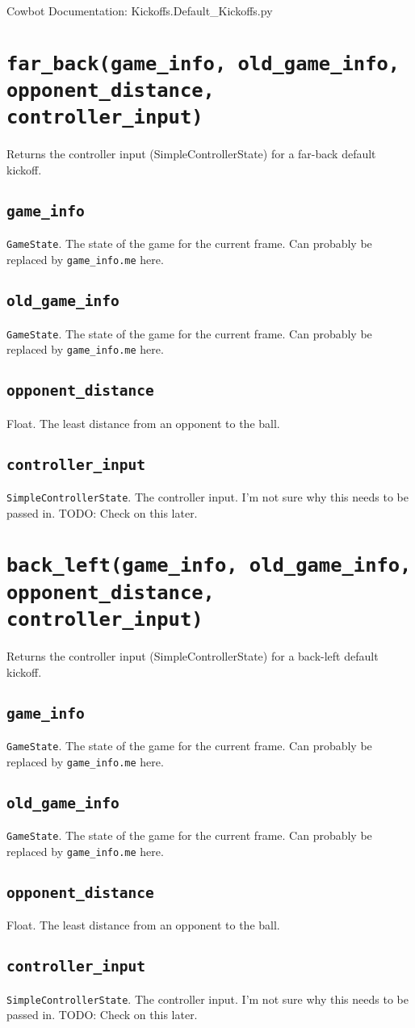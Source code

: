 \documentclass{article}
\newcommand{\function}[1]{\section{\texttt{#1}}}
\newcommand{\argumenta}[1]{\subsection{\texttt{#1}}}
\begin{document}
\begin{flushleft}

\begin{center}
  Cowbot Documentation: Kickoffs.Default\_Kickoffs.py
\end{center}



\function{far\_back(game\_info, old\_game\_info, opponent\_distance, controller\_input)}
         {
           Returns the controller input (SimpleControllerState) for a far-back default kickoff.


           \argumenta{game\_info}
                     {
                       \texttt{GameState}.  The state of the game for the current frame.  Can probably be replaced by \texttt{game\_info.me} here.
                     }
           \argumenta{old\_game\_info}
                     {
                       \texttt{GameState}.  The state of the game for the current frame.  Can probably be replaced by \texttt{game\_info.me} here.
                     }
           \argumenta{opponent\_distance}
                     {
                       Float.  The least distance from an opponent to the ball.
                     }
           \argumenta{controller\_input}
                     {
                       \texttt{SimpleControllerState}.  The controller input.  I'm not sure why this needs to be passed in.  TODO: Check on this later.
                     }
         }
         

\function{back\_left(game\_info, old\_game\_info, opponent\_distance, controller\_input)}
         {
           Returns the controller input (SimpleControllerState) for a back-left default kickoff.

           \argumenta{game\_info}
                     {
                       \texttt{GameState}.  The state of the game for the current frame.  Can probably be replaced by \texttt{game\_info.me} here.
                     }
           \argumenta{old\_game\_info}
                     {
                       \texttt{GameState}.  The state of the game for the current frame.  Can probably be replaced by \texttt{game\_info.me} here.
                     }
           \argumenta{opponent\_distance}
                     {
                       Float.  The least distance from an opponent to the ball.
                     }
           \argumenta{controller\_input}
                     {
                       \texttt{SimpleControllerState}.  The controller input.  I'm not sure why this needs to be passed in.  TODO: Check on this later.
                     }
         }




\end{flushleft}
\end{document}
